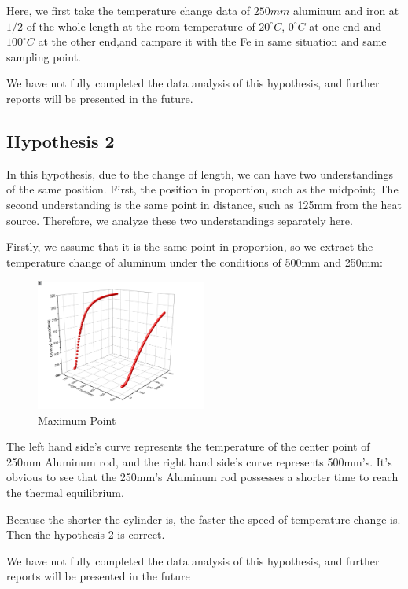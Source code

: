 \documentclass[12pt]{article}
\numberwithin{equation}{section}
\begin{document}
Here, we first take the temperature change data of $250mm$ aluminum and iron at $1 / 2$ of the whole length at the room temperature of $20 ^\circ C$, $0 ^\circ C$ at one end and $100 ^\circ C$ at the other end,and campare it with the Fe in same situation and same sampling point.


We have not fully completed the data analysis of this hypothesis, and further reports will be presented in the future.

\subsection{Hypothesis 2}
In this hypothesis, due to the change of length, we can have two understandings of the same position. First, the position in proportion, such as the midpoint; The second understanding is the same point in distance, such as 125mm from the heat source. Therefore, we analyze these two understandings separately here.


Firstly, we assume that it is the same point in proportion, so we extract the temperature change of aluminum under the conditions of 500mm and 250mm:
\begin{figure}[H] %
\centering %
\includegraphics[width=0.5\textwidth]{Hypothesis_2_1.png} %
\caption{Maximum Point} %
\end{figure} 


The left hand side’s curve represents the temperature of the center point of 250mm Aluminum rod, and the right hand side’s curve represents 500mm’s. It’s obvious to see that the 250mm’s Aluminum rod possesses a shorter time to reach the thermal equilibrium.

Because the shorter the cylinder is, the faster the speed of temperature change is. Then the hypothesis 2 is correct.




We have not fully completed the data analysis of this hypothesis, and further reports will be presented in the future
\end{document}
